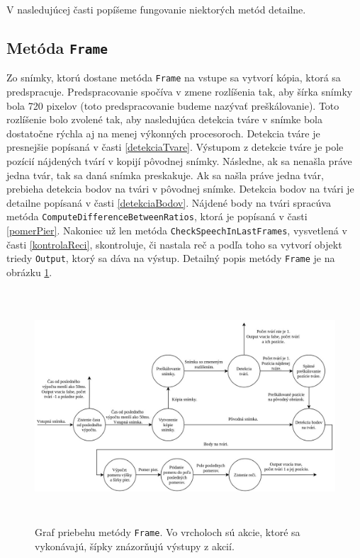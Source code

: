 V nasledujúcej časti popíšeme fungovanie niektorých metód detailne.

\subsection{Metóda \texttt{Frame}}
Zo snímky, ktorú dostane metóda \texttt{Frame} na vstupe sa vytvorí kópia, ktorá sa predspracuje.
Predspracovanie spočíva v zmene rozlíšenia tak, aby šírka snímky bola  720 pixelov (toto predspracovanie budeme nazývať preškálovanie).
Toto rozlíšenie bolo zvolené tak, aby nasledujúca detekcia tváre v snímke bola dostatočne rýchla aj na menej výkonných procesoroch.
Detekcia tváre je presnejšie popísaná v časti \ref{detekciaTvare}.
Výstupom z detekcie tváre je pole pozícií nájdených tvárí v kopijí pôvodnej snímky. 
Následne, ak sa nenašla práve jedna tvár, tak sa daná snímka preskakuje. 
Ak sa našla práve jedna tvár, prebieha detekcia bodov na tvári v pôvodnej snímke. 
Detekcia bodov na tvári je detailne popísaná v časti \ref{detekciaBodov}.
Nájdené body na tvári spracúva metóda \texttt{ComputeDifferenceBetweenRatios}, ktorá je popísaná v časti \ref{pomerPier}.
Nakoniec už len metóda \texttt{CheckSpeechInLastFrames}, vysvetlená v časti  \ref{kontrolaReci}, skontroluje, či nastala reč a podľa toho sa vytvorí objekt triedy \texttt{Output}, ktorý sa dáva na výstup. 
Detailný popis metódy \texttt{Frame} je na obrázku \ref{pic-Frame}.

\begin{figure}[H]
	\begin{center}
		\includegraphics[height=8.7cm]{pics/Frame.jpg}
		\caption{Graf priebehu metódy \texttt{Frame}. Vo vrcholoch sú akcie, ktoré sa vykonávajú, šípky znázorňujú výstupy z akcií.}
		\label{pic-Frame}
	\end{center}
\end{figure}

